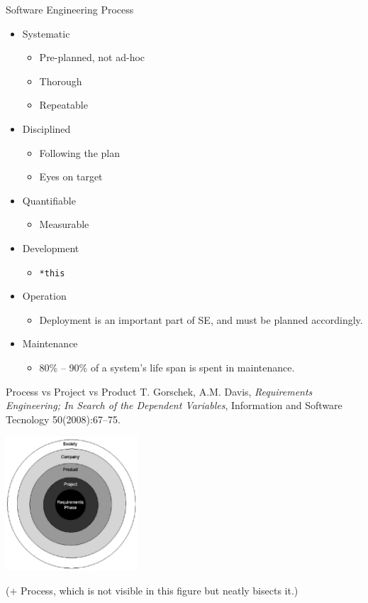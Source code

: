 \documentclass[10pt,t,a4paper]{beamer}
\begin{document}
\begin{frame}[fragile,label=sec-1-2]{Software Engineering Process}
 \begin{itemize}
\item \alert{Systematic}
\begin{itemize}
\item Pre-planned, not ad-hoc
\item Thorough
\item Repeatable
\end{itemize}
\item \alert{Disciplined}
\begin{itemize}
\item Following the plan
\item Eyes on target
\end{itemize}
\item \alert{Quantifiable}
\begin{itemize}
\item Measurable
\end{itemize}
\end{itemize}


\begin{itemize}
\item \alert{Development}
\begin{itemize}
\item \texttt{*this}
\end{itemize}
\item \alert{Operation}
\begin{itemize}
\item Deployment is an important part of SE, and must be planned accordingly.
\end{itemize}
\item \alert{Maintenance}
\begin{itemize}
\item 80\% -- 90\% of a system's life span is spent in maintenance.
\end{itemize}
\end{itemize}
\end{frame}
\begin{frame}[label=sec-1-3]{Process vs Project vs Product}
T. Gorschek, A.M. Davis, \emph{Requirements Engineering; In Search of the Dependent Variables}, Information and Software Tecnology 50(2008):67--75.

\includegraphics[height=5cm]{./FGorschek_Onion.pdf}

(+ Process, which is not visible in this figure but neatly bisects it.)
\end{frame}
\end{document}
